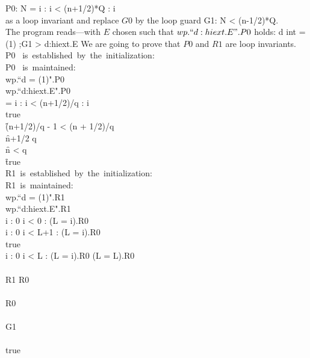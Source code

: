 \nf P0:  N = \< \mx i : i < (n+1/2)*Q : i \> \\
\unparskip
as a loop invariant and replace $G0$ by the loop guard
\nf G1:  N < (n-1/2)*Q\qquad.\\
\filbreak
The program reads---with $E$ chosen such that $wp.``d:hiext.E".P0$ holds:
\bblock
   d \vir int \array \:= (1) 
   ;\do G1 \-> d:hiext.E  \od
\eblock
We are going to prove that $P0$ and $R1$ are loop invariants.
\doparskip
\dnf P0 \hbox{ is established by the initialization}:\\
     P0 \hbox{ is maintained}:\\
\df  wp.``d \:= (1)".P0\\
     wp.``d:hiext.E".P0\\
\dh{}
 = \<\mx i : i < (n+1/2)/q : i\>\\
     true\\
\f  (n+1/2)/q - 1  < (n + 1/2)/q\\
\f  n+1/2 \le q\\
\f  n < q\\
\f  true\\
\doparskip
\dnf R1\hbox{ is established by the initialization}:\\
     R1\hbox{ is maintained}:\\
\df  wp.``d \:= (1)".R1\\
     wp.``d:hiext.E".R1\\
\dh{}
\df  \<\fa i : 0 \le i < 0 : \neg(L \:= i).R0 \>\\
     \< \fa i : 0 \le i < L+1 : \neg(L \:= i).R0 \>\\
\dh{}
\df  true\\
     \< \fa  i : 0 \le i < L : \neg(L \:= i).R0 \> \mand \neg(L \:= L).R0\\
\dh {} {} 
\df \\ R1 \mand  \neg R0\\
\dh{} {} 
\df \\ \neg R0\\
\dh {} {} 
\df \\ G1\\
\dh {} {} 
\df \\ true\\

